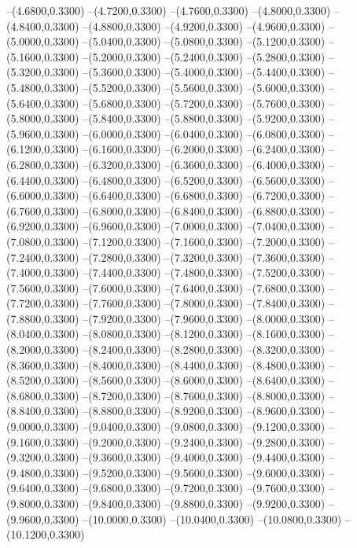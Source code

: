 {	--(4.6800,0.3300)
	--(4.7200,0.3300)
	--(4.7600,0.3300)
	--(4.8000,0.3300)
	--(4.8400,0.3300)
	--(4.8800,0.3300)
	--(4.9200,0.3300)
	--(4.9600,0.3300)
	--(5.0000,0.3300)
	--(5.0400,0.3300)
	--(5.0800,0.3300)
	--(5.1200,0.3300)
	--(5.1600,0.3300)
	--(5.2000,0.3300)
	--(5.2400,0.3300)
	--(5.2800,0.3300)
	--(5.3200,0.3300)
	--(5.3600,0.3300)
	--(5.4000,0.3300)
	--(5.4400,0.3300)
	--(5.4800,0.3300)
	--(5.5200,0.3300)
	--(5.5600,0.3300)
	--(5.6000,0.3300)
	--(5.6400,0.3300)
	--(5.6800,0.3300)
	--(5.7200,0.3300)
	--(5.7600,0.3300)
	--(5.8000,0.3300)
	--(5.8400,0.3300)
	--(5.8800,0.3300)
	--(5.9200,0.3300)
	--(5.9600,0.3300)
	--(6.0000,0.3300)
	--(6.0400,0.3300)
	--(6.0800,0.3300)
	--(6.1200,0.3300)
	--(6.1600,0.3300)
	--(6.2000,0.3300)
	--(6.2400,0.3300)
	--(6.2800,0.3300)
	--(6.3200,0.3300)
	--(6.3600,0.3300)
	--(6.4000,0.3300)
	--(6.4400,0.3300)
	--(6.4800,0.3300)
	--(6.5200,0.3300)
	--(6.5600,0.3300)
	--(6.6000,0.3300)
	--(6.6400,0.3300)
	--(6.6800,0.3300)
	--(6.7200,0.3300)
	--(6.7600,0.3300)
	--(6.8000,0.3300)
	--(6.8400,0.3300)
	--(6.8800,0.3300)
	--(6.9200,0.3300)
	--(6.9600,0.3300)
	--(7.0000,0.3300)
	--(7.0400,0.3300)
	--(7.0800,0.3300)
	--(7.1200,0.3300)
	--(7.1600,0.3300)
	--(7.2000,0.3300)
	--(7.2400,0.3300)
	--(7.2800,0.3300)
	--(7.3200,0.3300)
	--(7.3600,0.3300)
	--(7.4000,0.3300)
	--(7.4400,0.3300)
	--(7.4800,0.3300)
	--(7.5200,0.3300)
	--(7.5600,0.3300)
	--(7.6000,0.3300)
	--(7.6400,0.3300)
	--(7.6800,0.3300)
	--(7.7200,0.3300)
	--(7.7600,0.3300)
	--(7.8000,0.3300)
	--(7.8400,0.3300)
	--(7.8800,0.3300)
	--(7.9200,0.3300)
	--(7.9600,0.3300)
	--(8.0000,0.3300)
	--(8.0400,0.3300)
	--(8.0800,0.3300)
	--(8.1200,0.3300)
	--(8.1600,0.3300)
	--(8.2000,0.3300)
	--(8.2400,0.3300)
	--(8.2800,0.3300)
	--(8.3200,0.3300)
	--(8.3600,0.3300)
	--(8.4000,0.3300)
	--(8.4400,0.3300)
	--(8.4800,0.3300)
	--(8.5200,0.3300)
	--(8.5600,0.3300)
	--(8.6000,0.3300)
	--(8.6400,0.3300)
	--(8.6800,0.3300)
	--(8.7200,0.3300)
	--(8.7600,0.3300)
	--(8.8000,0.3300)
	--(8.8400,0.3300)
	--(8.8800,0.3300)
	--(8.9200,0.3300)
	--(8.9600,0.3300)
	--(9.0000,0.3300)
	--(9.0400,0.3300)
	--(9.0800,0.3300)
	--(9.1200,0.3300)
	--(9.1600,0.3300)
	--(9.2000,0.3300)
	--(9.2400,0.3300)
	--(9.2800,0.3300)
	--(9.3200,0.3300)
	--(9.3600,0.3300)
	--(9.4000,0.3300)
	--(9.4400,0.3300)
	--(9.4800,0.3300)
	--(9.5200,0.3300)
	--(9.5600,0.3300)
	--(9.6000,0.3300)
	--(9.6400,0.3300)
	--(9.6800,0.3300)
	--(9.7200,0.3300)
	--(9.7600,0.3300)
	--(9.8000,0.3300)
	--(9.8400,0.3300)
	--(9.8800,0.3300)
	--(9.9200,0.3300)
	--(9.9600,0.3300)
	--(10.0000,0.3300)
	--(10.0400,0.3300)
	--(10.0800,0.3300)
	--(10.1200,0.3300)
}
